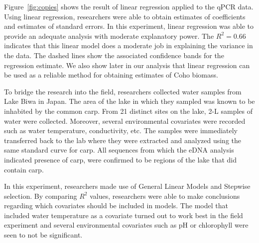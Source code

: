   Figure~\ref{fig:copies} shows the result of linear regression applied to the qPCR data. Using linear regression, researchers were able to obtain estimates of coefficients and estimates of standard errors. In this experiment, linear regression was able to provide an adequate analysis with moderate explanatory power. The $R^{2}=0.66$ indicates that this linear model does a moderate job in explaining the variance in the data. The dashed lines show the associated confidence bands for the regression estimate. We also show later in our analysis that linear regression can be used as a reliable method for obtaining estimates of Coho biomass. 


\vspace{5mm}

To bridge the research into the field, researchers collected water samples from Lake Biwa in Japan. The area of the lake in which they sampled was known to be inhabited by the common carp. From 21 distinct sites on the lake, 2-L samples of water were collected. Moreover, several environmental covariates were recorded such as water temperature, conductivity, etc. The samples were immediately transferred  back to the lab where they were extracted and analyzed using the same standard curve for carp. All sequences from which the eDNA analysis indicated presence of carp, were confirmed to be regions of the lake that did contain carp.


\vspace{5mm}

 In this experiment, researchers made use of General Linear Models and Stepwise selection. By comparing $R^{2}$ values, researchers were able to make conclusions regarding which covariates should be included in models. The model that included water temperature as a covariate turned out to work best in the field experiment and several environmental covariates such as pH or chlorophyll were seen to not be significant.


